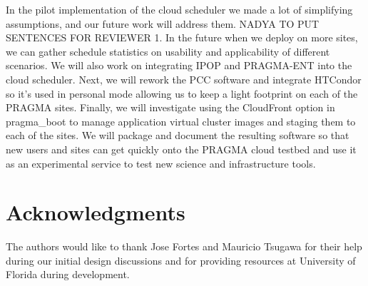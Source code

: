 \documentclass[times]{cpeauth}
\begin{document}
In the pilot implementation of the cloud scheduler  we made a lot of simplifying assumptions, and  our future work will address them.  NADYA TO PUT SENTENCES FOR REVIEWER 1.  In the future when we deploy on more sites, we can gather schedule statistics on usability and applicability of different scenarios.   We will also work on integrating IPOP and PRAGMA-ENT into the cloud scheduler.  Next, we will rework the PCC software and integrate HTCondor so it's used in personal mode allowing us to keep a light footprint on each of the PRAGMA sites.  Finally, we will investigate using the CloudFront option in pragma\_boot to manage application virtual cluster images and staging them to each of the sites.     We will package and document the resulting software so that new users and sites can get quickly onto the PRAGMA cloud testbed and use it as an experimental service to test new science and infrastructure tools.


\section{Acknowledgments}

The authors would like to thank Jose Fortes and Mauricio Tsugawa for their help during our initial design discussions and for providing resources at University of Florida during development.


  
\end{document}
